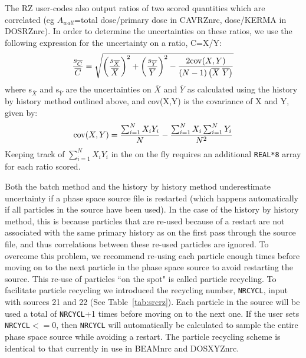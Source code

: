 \documentclass[12pt,twoside]{article}  %
\begin{document}
The RZ user-codes also output ratios of two scored quantities
which are correlated (eg $A_{wall}$=total dose/primary dose in CAVRZnrc,
dose/KERMA in DOSRZnrc).  In order to determine the uncertainties on these
ratios, we use the following expression for the uncertainty on a
ratio, C=X/Y:
\begin{equation}
\frac{s_{\overline{C}}}{\overline{C}} =
\sqrt{\left({\frac{s_{\overline{X}}}{\overline{X}}}\right)^2 +
\left({\frac{s_{\overline{Y}}}{\overline{Y}}}\right)^2 - \frac{2{\rm cov}(X,Y)}
{\left(N-1\right)\left(\overline{X}~\overline{Y}\right)}}
\end{equation}
where s$_{\overline{X}}$ and s$_{\overline{Y}}$ are the uncertainties on
$\overline{X}$ and $\overline{Y}$ as calculated using the history by
history method outlined above, and cov(X,Y) is the covariance of X and Y, given by:
\begin{equation}
{\rm cov}(X,Y)=\frac{\sum_{i=1}^{N}X_iY_i}{N}-\frac{\sum_{i=1}^{N}X_i\sum_{i=1}^{N}Y_i}{N^2}
\label{coveq}
\end{equation}
Keeping track of $\sum_{i=1}^{N}X_iY_i$ in the  on the fly
requires an additional {\tt REAL*8} array for each ratio scored.

Both the batch method and the history by history method underestimate
uncertainty if a phase space source file is restarted (which happens
automatically if all particles in the source have been used).  In the
case of the history by history method, this is because particles
that are re-used because of a restart are not associated with the
same primary history as on the first pass through the source file,
and thus correlations between these re-used particles are ignored.
To overcome this problem, we recommend re-using each particle enough
times before moving on to the next particle in the phase space source to
avoid restarting the source.  This re-use of particles ``on the spot"
is called particle recycling.  To facilitate particle recycling we
introduced the recycling number, {\tt NRCYCL}, input with sources 21
and 22 (See Table~\ref{tab:srcrz}).  Each particle in the source will be
used a total of {\tt NRCYCL}+1 times before moving on to the next one.
If the user sets {\tt NRCYCL}$<=$0, then {\tt NRCYCL} will automatically
be calculated to sample the entire phase space source while avoiding
a restart.  The particle recycling scheme is identical to that currently
in use in BEAMnrc and DOSXYZnrc.
\end{document}
